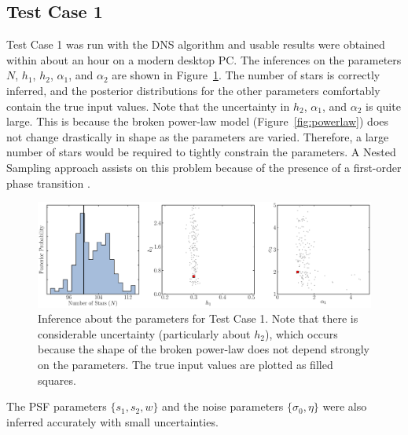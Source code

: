 \documentclass[12pt, preprint]{aastex}
\begin{document}
\subsection{Test Case 1}
Test Case 1 was run with the DNS algorithm and usable results were obtained
within about an hour on a modern desktop PC. The inferences on the parameters
$N$, $h_1$, $h_2$, $\alpha_1$, and $\alpha_2$ are shown in
Figure~\ref{fig:results1}. The number of stars is correctly inferred, and the
posterior distributions for the other parameters comfortably contain the true
input values. Note that the uncertainty in $h_2$, $\alpha_1$, and $\alpha_2$ is
quite large. This is because the broken power-law model
(Figure~\ref{fig:powerlaw}) does not change drastically in shape as the
parameters are varied. Therefore, a large number of stars would be required to
tightly constrain the parameters. A Nested Sampling approach assists on
this problem because of the presence of a first-order phase transition
\citep{skilling}.

\begin{figure}[ht!]
\begin{center}
\includegraphics[width=\textwidth]{Figures/inference1.eps}
\end{center}
\caption{Inference about the parameters for Test Case 1. Note that there is
considerable uncertainty (particularly about $h_2$), which occurs because the
shape of the broken power-law does not depend strongly on the parameters.
The true input values are plotted as filled squares.
\label{fig:results1}}
\end{figure}

The PSF parameters $\{s_1, s_2, w\}$ and the noise parameters $\{\sigma_0, \eta\}$
were also inferred accurately with small uncertainties.
\end{document}
